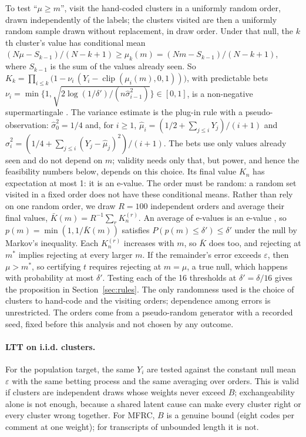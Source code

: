 To test ``$\mu\ge m$'', visit the hand-coded clusters in a uniformly random order, drawn independently of the labels; the
clusters visited are then a uniformly random sample drawn without replacement, in draw order. Under that null, the $k$th
cluster's value has conditional mean $(N\mu-S_{k-1})/(N-k+1)\ge \mu_k(m)=(Nm-S_{k-1})/(N-k+1)$, where $S_{k-1}$ is the sum of
the values already seen. So $K_k=\prod_{i\le k}\bigl(1-\nu_i\,(Y_i-\operatorname{clip}(\mu_i(m),0,1))\bigr)$, with predictable
bets $\nu_i=\min\{1,\sqrt{2\log(1/\delta')/(n\hat\sigma^2_{i-1})}\}\in[0,1]$, is a non-negative supermartingale
\citep{waudbysmith2024betting}. The variance estimate is the plug-in rule with a pseudo-observation: $\hat\sigma^2_0=1/4$ and,
for $i\ge1$, $\hat\mu_i=(1/2+\sum_{j\le i}Y_j)/(i+1)$ and $\hat\sigma^2_i=(1/4+\sum_{j\le i}(Y_j-\hat\mu_j)^2)/(i+1)$. The bets
use only values already seen and do not depend on $m$; validity needs only that, but power, and hence the feasibility numbers
below, depends on this choice. Its final value $K_n$ has expectation at most 1: it is an e-value. The order must be
random: a random set visited in a fixed order does not have these conditional means. Rather than rely on one random order, we
draw $R=100$ independent orders and average their final values, $\bar K(m)=R^{-1}\sum_r K_n^{(r)}$.
An average of e-values is an e-value \citep{vovk2021evalues}, so $p(m)=\min(1,1/\bar K(m))$ satisfies $P(p(m)\le\delta')\le\delta'$
under the null by Markov's inequality. Each $K_n^{(r)}$ increases with $m$, so $\bar K$ does too, and rejecting at $m^\ast$
implies rejecting at every larger $m$. If the remainder's error exceeds $\varepsilon$, then $\mu>m^\ast$, so certifying $t$
requires rejecting at $m=\mu$, a true null, which happens with probability at most $\delta'$. Testing each of the 16
thresholds at $\delta'=\delta/16$ gives the proposition in Section~\ref{sec:rules}. The only randomness used is the choice of
clusters to hand-code and the visiting orders; dependence among errors is unrestricted. The orders come from a
pseudo-random generator with a recorded seed, fixed before this analysis and not chosen by any outcome.

\paragraph{LTT on i.i.d. clusters.} For the population target, the same $Y_i$ are tested against the constant null mean
$\varepsilon$ with the same betting process and the same averaging over orders. This is valid if clusters are independent draws whose weights never exceed $B$;
exchangeability alone is not enough, because a shared latent cause can make every cluster right or every cluster wrong
together. For MFRC, $B$ is a genuine bound (eight codes per comment at one weight); for transcripts of unbounded length it is not.

